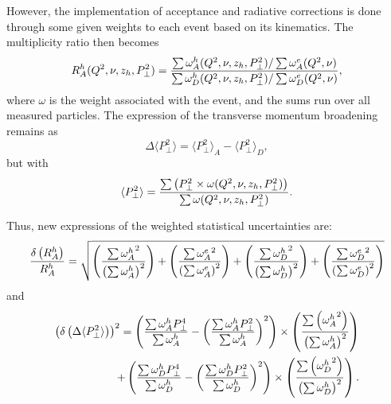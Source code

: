 However, the implementation of acceptance and radiative corrections is done through some given weights to each event based on its kinematics. The multiplicity ratio then becomes
\begin{equation}
R_A^h (Q^2,\nu,z_h,P_\perp^2) = {{\sum \omega_A^h (Q^2,\nu,z_h,P_\perp^2) / \sum \omega_A^e (Q^2,\nu)} 
                       \over {\sum \omega_D^h (Q^2,\nu,z_h,P_\perp^2) / \sum \omega_D^e (Q^2,\nu)}},
\end{equation}
where $\omega$ is the weight associated with the event, and the sums run over all measured particles. The expression of the transverse momentum broadening remains as
\begin{equation}
\Delta \langle P_\perp^2 \rangle = \langle P_\perp^2 \rangle_A - \langle P_\perp^2 \rangle_D,
\end{equation}
but with
\begin{equation}
\langle P_\perp^2 \rangle = {\sum \left ( P_\perp^2 \times \omega (Q^2,\nu,z_h,P_\perp^2) \right ) \over \sum \omega (Q^2,\nu,z_h,P_\perp^2)}.
\end{equation}

Thus, new expressions of the weighted statistical uncertainties are: 
\begin{equation}
{\delta \left ( R_A^h \right ) \over R_A^h} = 
      \sqrt{ \left ( {\sum {\omega^h_A}^2 \over \left (\sum \omega^h_A \right )^2} \right ) 
           + \left ( {\sum {\omega^e_A}^2 \over \left (\sum \omega^e_A \right )^2} \right ) 
           + \left ( {\sum {\omega^h_D}^2 \over \left (\sum \omega^h_D \right )^2} \right ) 
           + \left ( {\sum {\omega^e_D}^2 \over \left (\sum \omega^e_D \right )^2} \right ) }
\end{equation}
 and 
\begin{equation}
\begin{split}
\left ( \delta \left ( \Delta \langle P_\perp^2 \rangle \right ) \right )^2 = 
   \left ({{\sum \omega^h_A P_\perp^4 }\over{\sum \omega^h_A}} - \left ({\sum \omega^h_A P_\perp^2 }\over{\sum \omega^h_A}\right )^2 \right ) 
         \times \left ( {\sum \left ( {\omega^h_A}^2 \right ) \over \left ( \sum \omega^h_A \right ) ^2 }\right ) \\
 + \left ({{\sum \omega^h_D P_\perp^4 }\over{\sum \omega^h_D}} - \left ({\sum \omega^h_D P_\perp^2 }\over{\sum \omega^h_D}\right )^2 \right ) 
	 \times \left ( {\sum \left ( {\omega^h_D}^2 \right ) \over \left ( \sum \omega^h_D \right ) ^2 }\right ).
\end{split}
\end{equation}

